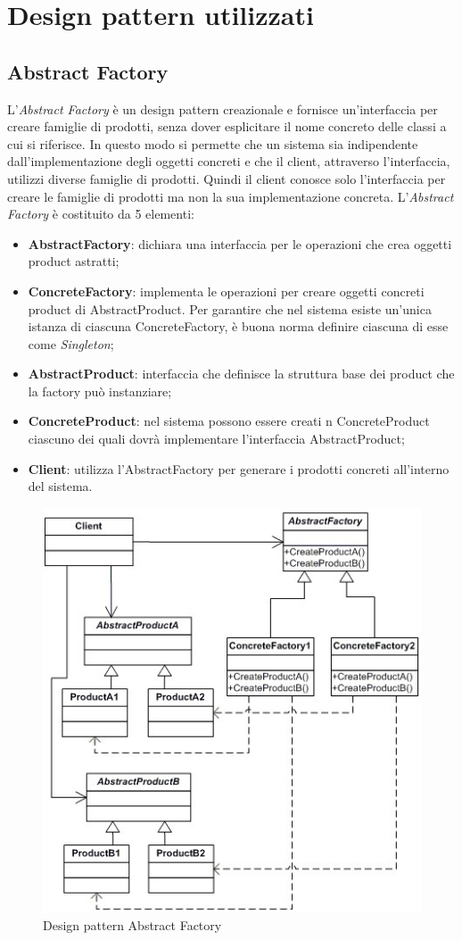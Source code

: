 \newpage
\section{Design pattern utilizzati}


\subsection{Abstract Factory}
L'\textit{Abstract Factory} è un design pattern creazionale e fornisce un'interfaccia per creare famiglie di prodotti, senza dover esplicitare il nome concreto delle classi a cui si riferisce. In questo modo si permette che un sistema sia indipendente dall'implementazione degli oggetti concreti e che il client, attraverso l'interfaccia, utilizzi diverse famiglie di prodotti. Quindi il client conosce solo l’interfaccia per creare le famiglie di prodotti ma non la sua implementazione concreta.
L’\textit{Abstract Factory} è costituito da 5 elementi:
\begin{itemize}
	\item \textbf{AbstractFactory}: dichiara una interfaccia per le operazioni che crea oggetti product astratti;
	\item \textbf{ConcreteFactory}: implementa le operazioni per creare oggetti concreti product di AbstractProduct. Per garantire che nel sistema esiste un’unica istanza di ciascuna ConcreteFactory, è buona norma definire ciascuna di esse come \textit{Singleton};
	\item \textbf{AbstractProduct}: interfaccia che definisce la struttura base dei product che la factory può instanziare;
	\item \textbf{ConcreteProduct}: nel sistema possono essere creati n ConcreteProduct ciascuno dei quali dovrà implementare l’interfaccia AbstractProduct;
	\item \textbf{Client}: utilizza l’AbstractFactory per generare i prodotti concreti all’interno del sistema.
\end{itemize}

\begin{figure}[H]
	\centering
	\includegraphics[width=0.5\linewidth]{IMG/abstract-pattern}
	\caption{Design pattern Abstract Factory}
\end{figure}


